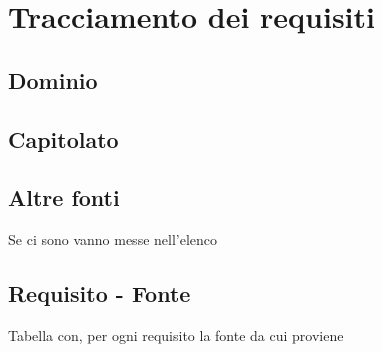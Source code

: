 \section{Tracciamento dei requisiti}
	\subsection{Dominio}
	\subsection{Capitolato}
	\subsection{Altre fonti}
	Se ci sono vanno messe nell'elenco

	\subsection{Requisito - Fonte}
	Tabella con, per ogni requisito la fonte da cui proviene